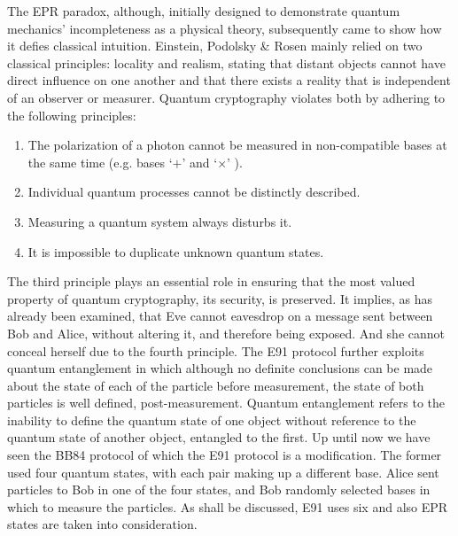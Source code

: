 The EPR paradox, although, initially designed to demonstrate quantum mechanics' incompleteness 
as a physical theory, subsequently came to show how it defies classical intuition.
Einstein, Podolsky \& Rosen mainly relied on two classical principles: locality and realism,
stating that distant objects cannot have direct influence on one another and that there
exists a reality that is independent of an observer or measurer. Quantum cryptography
violates both by adhering to the following principles:
\begin{center}
  \begin{enumerate}
    \item The polarization of a photon cannot be measured in non-compatible bases
          at the same time (e.g. bases `$\bm{+}$' and `$\bm{\times}$' ).
    \item Individual quantum processes cannot be distinctly described.
    \item Measuring a quantum system always disturbs it.
    \item It is impossible to duplicate unknown quantum states.
  \end{enumerate}
\end{center}
The third principle plays an essential role in ensuring that the most valued property of
quantum cryptography, its security, is preserved. It implies, as has already been examined,
that Eve cannot eavesdrop on a message sent between Bob and Alice, without altering it,
and therefore being exposed. And she cannot conceal herself due to the fourth principle.
The E91 protocol further exploits quantum entanglement in which although no definite
conclusions can be made about the state of each of the particle before measurement, the
state of both particles is well defined, post-measurement.
Quantum entanglement refers to the inability to define the quantum state of one object
without reference to the quantum state of another object, entangled to the first.
Up until now we have seen the BB84 protocol of which the E91 protocol is a modification.
The former used four quantum states, with each pair making up a different base.
Alice sent particles to Bob in one of the four states, and Bob randomly selected bases in
which to measure the particles. As shall be discussed, E91 uses six and also
EPR states are taken into consideration.
